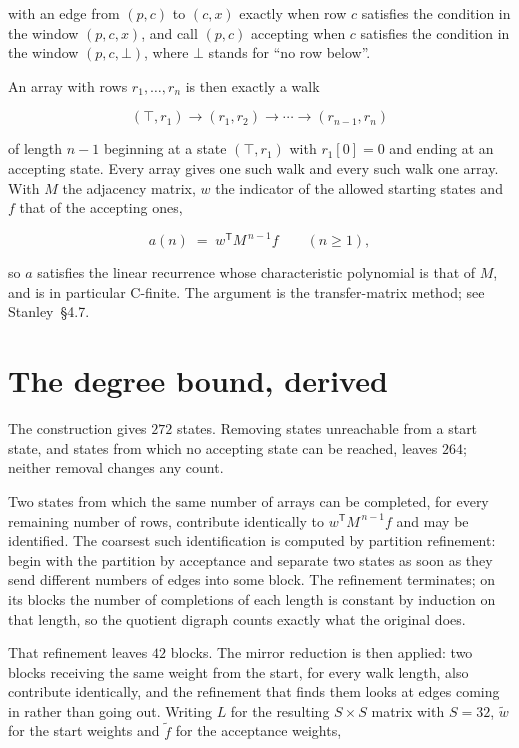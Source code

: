 \documentclass[11pt]{article}
\theoremstyle{definition}
\begin{document}
with an edge from $(p,c)$ to $(c,x)$ exactly when row $c$ satisfies the condition in the window $(p,c,x)$, and call $(p,c)$ accepting when $c$ satisfies the condition in the window $(p,c,\bot)$, where $\bot$ stands for ``no row below''.

An array with rows $r_1,\dots,r_n$ is then exactly a walk

\[(\top,r_1) \to (r_1,r_2) \to \cdots \to (r_{n-1},r_n)\]

of length $n-1$ beginning at a state $(\top,r_1)$ with $r_1[0]=0$ and ending at an accepting state. Every array gives one such walk and every such walk one array. With $M$ the adjacency matrix, $w$ the indicator of the allowed starting states and $f$ that of the accepting ones,

\[a(n) \;=\; w^{\mathsf T} M^{\,n-1} f \qquad (n \ge 1),\]

so $a$ satisfies the linear recurrence whose characteristic polynomial is that of $M$, and is in particular C-finite. The argument is the transfer-matrix method; see Stanley~\S4.7.

\section{The degree bound, derived}

The construction gives $272$ states. Removing states unreachable from a start state, and states from which no accepting state can be reached, leaves $264$; neither removal changes any count.

Two states from which the same number of arrays can be completed, for every remaining number of rows, contribute identically to $w^{\mathsf T}M^{\,n-1}f$ and may be identified. The coarsest such identification is computed by partition refinement: begin with the partition by acceptance and separate two states as soon as they send different numbers of edges into some block. The refinement terminates; on its blocks the number of completions of each length is constant by induction on that length, so the quotient digraph counts exactly what the original does.

That refinement leaves $42$ blocks. The mirror reduction is then applied: two blocks receiving the same weight from the start, for every walk length, also contribute identically, and the refinement that finds them looks at edges coming in rather than going out. Writing $L$ for the resulting $S \times S$ matrix with $S = 32$, $\tilde w$ for the start weights and $\tilde f$ for the acceptance weights,
\end{document}
